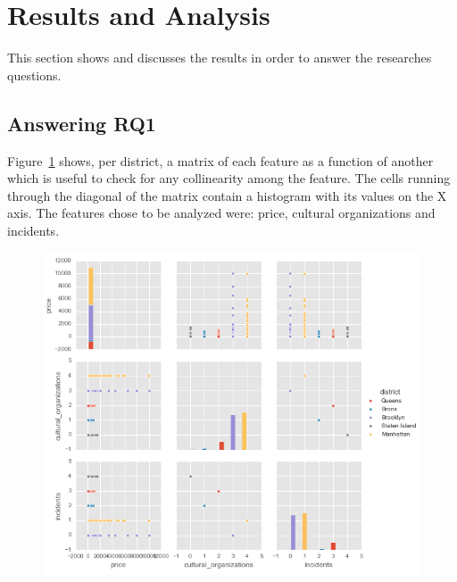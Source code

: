 \documentclass[sigconf]{acmart}
\begin{document}
%

\section{Results and Analysis}
\label{sec:results}

This section shows and discusses the results in order to answer the researches questions.

\subsection{Answering RQ1}

Figure~\ref{fig:pairwiserelationsprincipalfeatures} shows, per district, a matrix of each feature as a function of another which is useful to check for any collinearity among the feature. The cells running through the diagonal of the matrix contain a histogram with its values on the X axis. The features chose to be analyzed were: price, cultural organizations and incidents.

\begin{figure}[!htpb]
	\centering
	\includegraphics[width=\linewidth]{images/related_data2}
	\caption{}
	\label{fig:pairwiserelationsprincipalfeatures}
\end{figure}
\end{document}
